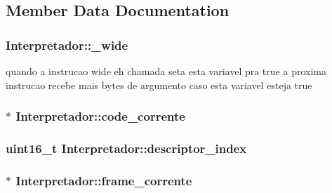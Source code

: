 \subsection{Member Data Documentation}
\hypertarget{classInterpretador_acc44aa8b361e93c3ddbeb5a6cf7978df}{
\subsubsection[{\+\_\+wide}]{\setlength{\rightskip}{0pt plus 5cm}Interpretador\+::\+\_\+wide}}\label{classInterpretador_acc44aa8b361e93c3ddbeb5a6cf7978df}
quando a instrucao wide eh chamada seta esta variavel pra true a proxima instrucao recebe mais bytes de argumento caso esta variavel esteja true \hypertarget{classInterpretador_adc0e318d8cf9188ef597daeef754c1b9}{
\subsubsection[{code\+\_\+corrente}]{$\ast$ Interpretador\+::code\+\_\+corrente\hspace{0.3cm}{\ttfamily [private]}}}\label{classInterpretador_adc0e318d8cf9188ef597daeef754c1b9}
\hypertarget{classInterpretador_a1689e627d6bbc165db98b1c3df67fc60}{
\subsubsection[{descriptor\+\_\+index}]{\setlength{\rightskip}{0pt plus 5cm}uint16\+\_\+t Interpretador\+::descriptor\+\_\+index\hspace{0.3cm}{\ttfamily [private]}}}\label{classInterpretador_a1689e627d6bbc165db98b1c3df67fc60}
\hypertarget{classInterpretador_a045818aa2a3f530ffb516d2bceac55a8}{
\subsubsection[{frame\+\_\+corrente}]{$\ast$ Interpretador\+::frame\+\_\+corrente\hspace{0.3cm}{\ttfamily [private]}}}\label{classInterpretador_a045818aa2a3f530ffb516d2bceac55a8}
